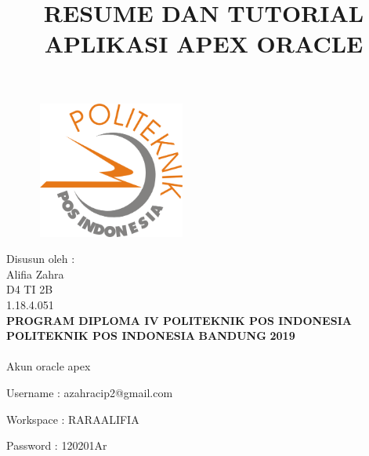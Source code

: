 \documentclass[a4paper, 12pt]{article}
\begin{document}
\title{\huge\textbf{RESUME DAN TUTORIAL APLIKASI APEX ORACLE}}
\date{}
\maketitle

\begin{figure}[!ht]
\begin{center}
\includegraphics[width = 5cm, height = 4.5cm]{GAMBAR/logo.png}
\end{center}
\end{figure}

\begin{center}
\vspace{1cm}
Disusun oleh :\\
Alifia Zahra\\
D4 TI 2B\\
1.18.4.051\\
\vspace{1cm}
\textbf{PROGRAM DIPLOMA IV POLITEKNIK POS INDONESIA} \linebreak
\textbf{POLITEKNIK POS INDONESIA} \linebreak
\textbf{BANDUNG}\linebreak
\textbf{2019}
\end{center}

\thispagestyle{empty}

\paragraph{}
    Akun oracle apex
    \par Username  : azahracip2@gmail.com
    \par Workspace : RARAALIFIA
    \par Password  : 120201Ar
    
\end{document}
